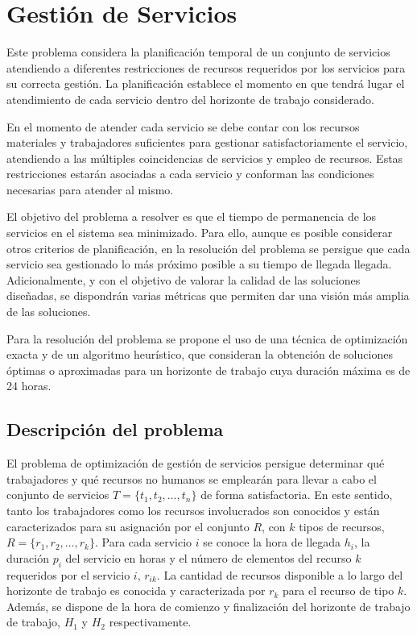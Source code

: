 \chapter{Gestión de Servicios}
\label{problema-servicios}

Este problema considera la planificación temporal de un conjunto de servicios atendiendo a diferentes restricciones de recursos requeridos por los servicios para su correcta gestión. La planificación establece el momento en que tendrá lugar el atendimiento de cada servicio dentro del horizonte de trabajo considerado. 

En el momento de atender cada servicio se debe contar con los recursos materiales y trabajadores suficientes para gestionar satisfactoriamente el servicio, atendiendo a las múltiples coincidencias de servicios y empleo de recursos. Estas restricciones estarán asociadas a cada servicio y conforman las condiciones necesarias para atender al mismo.

El objetivo del problema a resolver es que el tiempo de permanencia de los servicios en el sistema sea minimizado. Para ello, aunque es posible considerar otros criterios de planificación, en la resolución del problema se persigue que cada servicio sea gestionado lo más próximo posible a su tiempo de llegada llegada. Adicionalmente, y con el objetivo de valorar la calidad de las soluciones diseñadas, se dispondrán varias métricas que permiten dar una visión más amplia de las soluciones.

Para la resolución del problema se propone el uso de una técnica de optimización exacta y de un algoritmo heurístico, que consideran la obtención de soluciones óptimas o aproximadas para un horizonte de trabajo cuya duración máxima es de 24 horas.

\section{Descripción del problema}

El problema de optimización de gestión de servicios persigue determinar qué trabajadores y qué recursos no humanos se emplearán para llevar a cabo el conjunto de servicios $T = \{t_1, t_2, \ldots, t_n\}$ de forma satisfactoria. En este sentido, tanto los trabajadores como los recursos involucrados son conocidos y están caracterizados para su asignación por el conjunto $R$, con $k$ tipos de recursos, $R = \{r_1, r_2, \ldots, r_k\}$. Para cada servicio $i$ se conoce la hora de llegada $h_i$, la duración $p_i$ del servicio en horas y el número de elementos del recurso $k$ requeridos por el servicio $i$, $r_{ik}$. La cantidad de recursos disponible a lo largo del horizonte de trabajo es conocida y caracterizada por $r_k$ para el recurso de tipo $k$. Además, se dispone de la hora de comienzo y finalización del horizonte de trabajo de trabajo, $H_1$ y $H_2$ respectivamente. 

